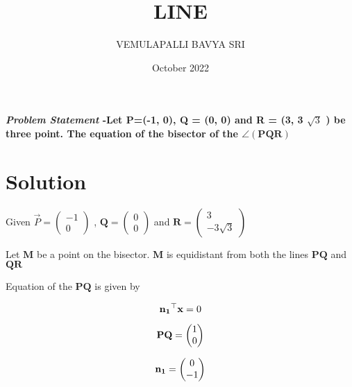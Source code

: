 \documentclass[journal,10pt,twocolumn]{article}
\title{\textbf{LINE}}
\author{VEMULAPALLI BAVYA SRI}
\date{October 2022}
\let\vec\mathbf
\begin{document}
\maketitle
\paragraph{\textit{Problem Statement} -Let P=(-1, 0), Q = (0, 0) and R = (3, 3  $\sqrt{3}$  ) be three point. The equation of the bisector of the  $\angle(\vec{PQR})$ }
  
\section{Solution}

    Given  $\Vec{P}  =  \begin{pmatrix}
            -1\\ 
            0
            \end{pmatrix}$  ,
            $\vec{Q}  =  \begin{pmatrix}
            0 \\ 
            0
            \end{pmatrix}$
        and  $\vec{R}  =  \begin{pmatrix}
            3 \\ 
            -3\sqrt{3}
            \end{pmatrix}$
\begin{flushleft}
    Let  $\vec{M}$  be a point on the bisector.  $\vec{M}$  is equidistant from both the lines  $\vec{PQ}$ and   $\vec{QR}$ 
\vspace{0.1cm}

    
    Equation of the  $\vec{PQ}$  is given by
    
    \end{flushleft}
    
\begin{equation}
\vec{n_1}^\top \vec{x}= 0
\vspace{0.1cm}
\end{equation}
    
\begin{equation}
\vec{PQ} = \begin{pmatrix}
        1\\ 
        0
        \end{pmatrix} 
        \vspace{0.1cm}
\end{equation}
    
\begin{equation}
\vec{n_1}  =  \begin{pmatrix}
        0\\ 
        -1
        \end{pmatrix} 
        \vspace{0.1cm}
\end{equation}
    
\end{document}
